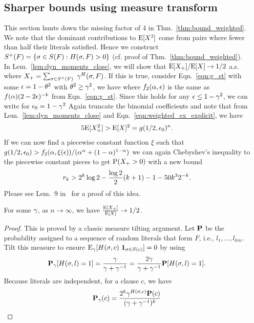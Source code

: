 \documentclass[letterpaper, 10pt, twocolumn, reqno]{amsart}
\begin{document}
\subsection{Sharper bounds using measure transform}
\label{ssec:sharper_bounds}

This section hunts down the missing factor of 4 in Thm.~\ref{thm:bound_weighted}. We note that the dominant contributions to $\E[X^2]$ come from pairs where fewer than half their literals satisfied. Hence we construct
$\spf = \cbrac{\s \in \sf: \hsf > 0}$
(cf. proof of Thm.~\ref{thm:bound_weighted}). In Lem.~\ref{lem:dyn_moments_close}, we will show that $\E[X_+]/\E[X] \to 1/2$ a.s. where $X_+ = \sum_{\s \in \spf}\ \g^\hsf$. If this is true, consider Eqn.~\ref{eqn:g_st} with some $\e = 1 -\th^2$ with $\th^2 \geq \g^2$, we have
where $f_2(\a,\e)$ is the same as $f(\a) (2-2\e)^{-k}$ from Eqn.~\eqref{eqn:g_st}. Since this holds for any $\e \leq 1 -\g^2$, we can write for $\e_0 = 1 - \g^2$
Again truncate the binomial coefficients and note that from Lem.~\ref{lem:dyn_moments_close} and Eqn.~\eqref{eqn:weighted_ex_explicit}, we have
$$
5 \E[X_+^2] > \E[X]^2 = g(1/2, \e_0)^n.
$$
If we can now find a piecewise constant function $\xi$ such that $g(1/2,\e_0) > f_2(\a,\xi(\e))/(\a^\a + (1-\a)^{1-\a})$ we can again Chebyshev's inequality to the piecewise constant pieces to get $\P(X_+ > 0)$ with a new bound
$$r_k > 2^k \log 2 -\f{\log 2}{2} (k+1) -1 -50k^3 2^{-k}.$$
Please see Lem.~9 in~\cite{achlioptas2004threshold} for a proof of this idea.

\begin{lemma}
For some $\g$, as $n\to \infty$, we have $\f{\E[X_+]}{\E[X]} \to 1/2$.
\label{lem:dyn_moments_close}
\end{lemma}
\begin{proof}
This is proved by a classic measure tilting argument. Let $\bP$ be the probability assigned to a sequence of random literals that form $F$, i.e., $l_1, \ldots, l_{km}$. Tilt this measure to ensure $\E_\g[\hsc\ \ind_{\s \in \sc}] = 0$ by using
$$
\bPg[\hsl = 1] = \f{\g}{\g + \g^{-1}} = \f{2 \g}{\g + \g^{-1}} \bP[\hsl = 1].
$$
Because literals are independent, for a clause $c$, we have
$$
\bPg(c) = \f{2^k \g^{\hsc} \bP(c)}{(\g +\g^{-1})^k}
$$
\end{proof}
\end{document}
